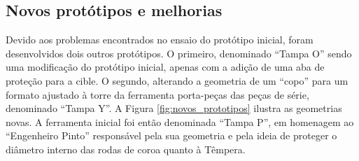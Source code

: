 \subsection{Novos protótipos e melhorias} \label{ssec:novos_prototipos}
Devido aos problemas encontrados no ensaio do protótipo inicial, foram desenvolvidos dois outros protótipos. O primeiro, denominado “Tampa O” sendo uma modificação do protótipo inicial, apenas com a adição de uma aba de proteção para a cible. O segundo, alterando a geometria de um “copo” para um formato ajustado à torre da ferramenta porta-peças das peças de série, denominado “Tampa Y”. A Figura \ref{fig:novos_prototipos} ilustra as geometrias novas. A ferramenta inicial foi então denominada “Tampa P”, em homenagem ao “Engenheiro Pinto” responsável pela sua geometria e pela ideia de proteger o diâmetro interno das rodas de coroa quanto à Têmpera.
